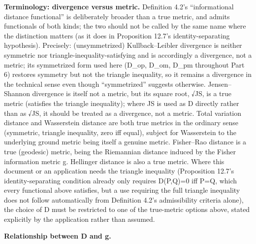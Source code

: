 \documentclass[
]{article}
\begin{document}
\textbf{Terminology: divergence versus metric.} Definition 4.2's
``informational distance functional'' is deliberately broader than a
true metric, and admits functionals of both kinds; the two should not be
called by the same name where the distinction matters (as it does in
Proposition 12.7's identity-separating hypothesis). Precisely:
(unsymmetrized) Kullback--Leibler divergence is neither symmetric nor
triangle-inequality-satisfying and is accordingly a divergence, not a
metric; its symmetrized form used here (D\_op, D\_om, D\_pm throughout
Part 6) restores symmetry but not the triangle inequality, so it remains
a divergence in the technical sense even though ``symmetrized'' suggests
otherwise. Jensen--Shannon divergence is itself not a metric, but its
square root, √JS, is a true metric (satisfies the triangle inequality);
where JS is used as D directly rather than as √JS, it should be treated
as a divergence, not a metric. Total variation distance and Wasserstein
distance are both true metrics in the ordinary sense (symmetric,
triangle inequality, zero iff equal), subject for Wasserstein to the
underlying ground metric being itself a genuine metric. Fisher--Rao
distance is a true (geodesic) metric, being the Riemannian distance
induced by the Fisher information metric g. Hellinger distance is also a
true metric. Where this document or an application needs the triangle
inequality (Proposition 12.7's identity-separating condition already
only requires D(P,Q)=0 iff P=Q, which every functional above satisfies,
but a use requiring the full triangle inequality does not follow
automatically from Definition 4.2's admissibility criteria alone), the
choice of D must be restricted to one of the true-metric options above,
stated explicitly by the application rather than assumed.

\textbf{Relationship between D and g.}
\end{document}
